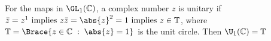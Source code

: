 \documentclass[../Project.tex]{subfiles}
\begin{document}
\begin{exam}[\cite{1}]
	For the maps in $\GL_1(\mathbb{C})$, a complex number $z$ is unitary if $\bar{z} = z^1 \text{ implies } z\bar{z} = \abs{z}^2 = 1 \text{ implies } z \in \mathbb{T}$, where $\mathbb{T} = \Brace{z \in \mathbb{C}\;:\;\abs{z} = 1}$ is the unit circle. Then $\U_1(\mathbb{C}) = \mathbb{T}$
	\label{unitaryexam}
\end{exam}
\fi
\end{document}

